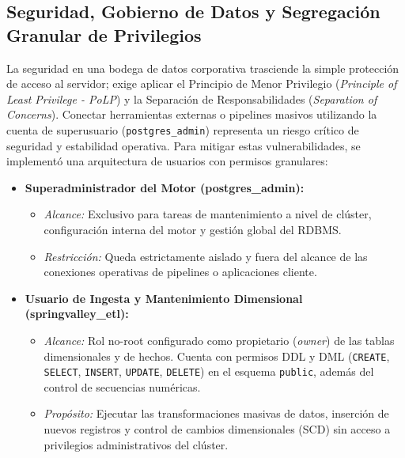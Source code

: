 \subsection{Seguridad, Gobierno de Datos y Segregación Granular de Privilegios}
La seguridad en una bodega de datos corporativa trasciende la simple protección de acceso al servidor; exige aplicar el Principio de Menor Privilegio (\textit{Principle of Least Privilege - PoLP}) y la Separación de Responsabilidades (\textit{Separation of Concerns}). Conectar herramientas externas o pipelines masivos utilizando la cuenta de superusuario (\texttt{postgres\_admin}) representa un riesgo crítico de seguridad y estabilidad operativa. Para mitigar estas vulnerabilidades, se implementó una arquitectura de usuarios con permisos granulares:

\begin{itemize}
	\item \textbf{Superadministrador del Motor (postgres\_admin):}
	\begin{itemize}
		\item \textit{Alcance:} Exclusivo para tareas de mantenimiento a nivel de clúster, configuración interna del motor y gestión global del RDBMS.
		\item \textit{Restricción:} Queda estrictamente aislado y fuera del alcance de las conexiones operativas de pipelines o aplicaciones cliente.
	\end{itemize}
	
	\item \textbf{Usuario de Ingesta y Mantenimiento Dimensional (springvalley\_etl):}
	\begin{itemize}
		\item \textit{Alcance:} Rol no-root configurado como propietario (\textit{owner}) de las tablas dimensionales y de hechos. Cuenta con permisos DDL y DML (\texttt{CREATE}, \texttt{SELECT}, \texttt{INSERT}, \texttt{UPDATE}, \texttt{DELETE}) en el esquema \texttt{public}, además del control de secuencias numéricas.
		\item \textit{Propósito:} Ejecutar las transformaciones masivas de datos, inserción de nuevos registros y control de cambios dimensionales (SCD) sin acceso a privilegios administrativos del clúster.
	\end{itemize}
	

\end{itemize}
